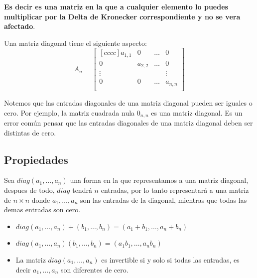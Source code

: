 \documentclass[12pt, fleqn]{report}                             %
\theoremstyle{break}                                            %
\begin{document}
                \textbf{Es decir es una matriz en la que a cualquier elemento lo puedes multiplicar 
                por la Delta de Kronecker correspondiente y no se vera afectado}.

                Una matriz diagonal tiene el siguiente aspecto:
                \begin{equation*}
                    A_n =
                    \begin{bmatrix}[cccc]
                        a_{1,1} & 0         & \dots & 0         \\
                        0       & a_{2,2}   & \dots & 0         \\
                        \vdots  &           &       & \vdots    \\
                        0       & 0         & \dots & a_{n,n}   \\
                    \end{bmatrix}
                \end{equation*}

                Notemos que las entradas diagonales de una matriz diagonal pueden ser iguales o cero.
                Por ejemplo, la matriz cuadrada nula $0_{n, n}$ es una matriz diagonal.
                Es un error común pensar que las entradas diagonales de una matriz diagonal deben
                ser distintas de cero.


            \clearpage
            \subsection{Propiedades}

                Sea $diag(a_1, \dots, a_n)$ una forma en la que representamos a una matriz diagonal,
                despues de todo, $diag$ tendrá $n$ entradas, por lo tanto representará a una matriz
                de $n \times n$ donde $a_1, \dots, a_n$ son las entradas de la diagonal, mientras que
                todas las demas entradas son cero.

                \begin{itemize}
                    
                    \item
                        $diag(a_1, \dots, a_n) + (b_1, \dots, b_n) = (a_1+b_1, \dots, a_n+b_n)$

                    \item
                        $diag(a_1, \dots, a_n)(b_1, \dots, b_n) = (a_1b_1, \dots, a_nb_n)$

                    \item 
                        La matriz $diag(a_1, \dots, a_n)$ es invertible si y solo si todas las entradas, 
                        es decir $a_1, \dots, a_n$ son diferentes de cero. 

                \end{itemize}
\end{document}
